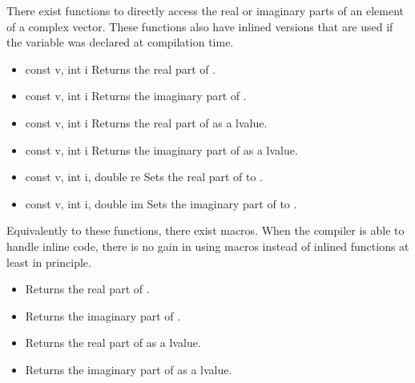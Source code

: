 There exist functions to directly access the real or imaginary parts of an
element of a complex vector. These functions also have inlined versions that
are used if the variable  was declared at compilation time.

\begin{itemize}
\item {}
  {const  \ptr v, int i}
  \sshortdescribe Returns the real part of .
  
\item {}
  {const  \ptr v, int i}
  \sshortdescribe Returns the imaginary part of .

\item {}
  {const  \ptr v, int i}
  \sshortdescribe Returns the real part of  as a lvalue.

\item {}
  {const  \ptr v, int i}
  \sshortdescribe Returns the imaginary part of  as a lvalue.

\item {}
  {const  \ptr v, int i, double re}
  \sshortdescribe Sets the real part of  to .

\item {}
  {const  \ptr v, int i, double im}
  \sshortdescribe Sets the imaginary part of  to .
\end{itemize}

Equivalently to these functions, there exist macros. When the compiler is able
to handle inline code, there is no gain in using macros instead of inlined
functions at least in principle.
\begin{itemize}
\item {}
  \sshortdescribe Returns the real part of .
  
\item {}
  \sshortdescribe Returns the imaginary part of .
  
\item {}
  \sshortdescribe Returns the real part of  as a lvalue.
  
\item {}
  \sshortdescribe Returns the imaginary part of  as a lvalue.
\end{itemize}

